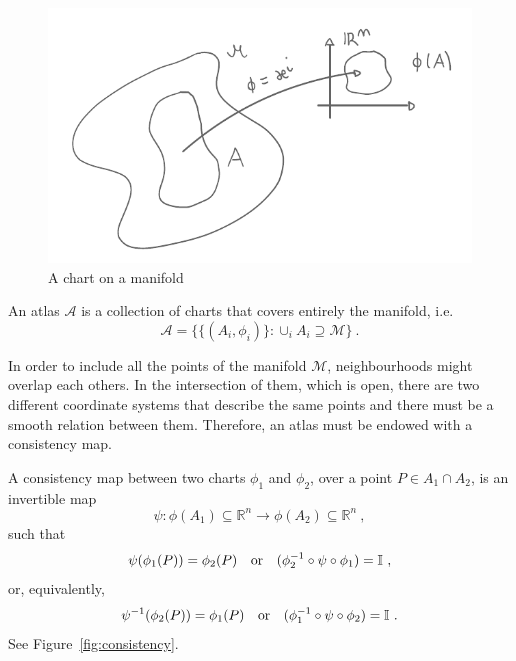     \begin{figure}[h!]
        \centering
        \includegraphics{chart.pdf}
        \caption{A chart on a manifold}\label{fig:chart}
    \end{figure}

    \begin{definition}[Atlas]
        An atlas $\mathcal A$ is a collection of charts that covers entirely the manifold, i.e. 
    \begin{equation*}
        \mathcal A = \{\{(A_i, \phi_i)\} \colon \cup_i A_i \supseteq \mathcal M \} ~.
    \end{equation*}
    \end{definition}
    \noindent In order to include all the points of the manifold $\mathcal M$, neighbourhoods might overlap each others. In the intersection of them, which is open, there are two different coordinate systems that describe the same points and there must be a smooth relation between them. Therefore, an atlas must be endowed with a consistency map.
    \begin{definition}
        A consistency map between two charts $\phi_1$ and $\phi_2$, over a point $P \in A_1 \cap A_2$, is an invertible map 
        \begin{equation*}
            \psi \colon \phi(A_1) \subseteq \mathbb R^n \rightarrow \phi(A_2) \subseteq \mathbb R^n ~,
        \end{equation*}
        such that 
        \begin{equation*}
            \psi(\phi_1(P)) = \phi_2(P) \quad \textnormal{or} \quad (\phi_2^{-1} \circ \psi \circ \phi_1) = \mathbb I ~,
        \end{equation*}
        or, equivalently, 
        \begin{equation*}
            \psi^{-1} (\phi_2(P)) = \phi_1(P) \quad \textnormal{or} \quad (\phi_1^{-1} \circ \psi \circ \phi_2) = \mathbb I ~.
        \end{equation*}
        See Figure~\ref{fig:consistency}.
    \end{definition}

